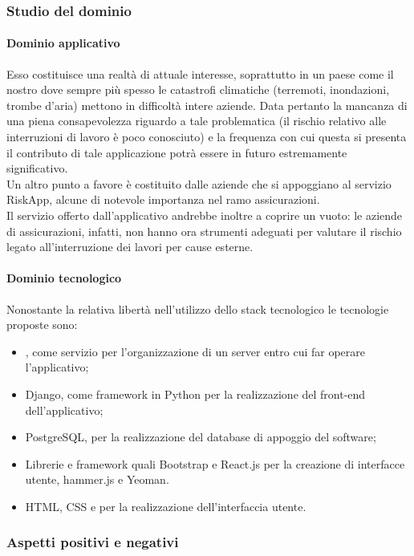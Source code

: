 		\subsubsection{Studio del dominio}
			\paragraph{Dominio applicativo}
			Esso costituisce una realtà di attuale interesse, soprattutto in un paese come il nostro dove sempre più spesso le catastrofi climatiche 
			(terremoti, inondazioni, trombe d'aria) mettono in difficoltà intere aziende. Data pertanto la mancanza di una piena consapevolezza 
			riguardo a tale problematica (il rischio relativo alle interruzioni di lavoro è poco conosciuto) e la frequenza con cui questa si presenta 
			il contributo di tale applicazione potrà essere in futuro estremamente significativo.
			\\Un altro punto a favore è costituito dalle aziende che si appoggiano al servizio RiskApp, alcune di notevole importanza nel ramo assicurazioni.
			\\Il servizio offerto dall'applicativo andrebbe inoltre a coprire un vuoto: le aziende di assicurazioni, infatti, non hanno ora strumenti 
			adeguati per valutare il rischio legato all'interruzione dei lavori per cause esterne.
			\paragraph{Dominio tecnologico}
			Nonostante la relativa libertà nell'utilizzo dello stack tecnologico le tecnologie proposte sono:
			\begin{itemize}
				\item {}, come servizio per l'organizzazione di un server entro cui far operare l'applicativo;
				\item Django, come framework in Python per la realizzazione del front-end dell'applicativo;
				\item PostgreSQL, per la realizzazione del database di appoggio del software;
				\item Librerie e framework quali Bootstrap e React.js per la creazione di interfacce utente, hammer.js e Yeoman.
				\item HTML, CSS e  per la realizzazione dell'interfaccia utente.
			\end{itemize}
		\subsubsection{Aspetti positivi e negativi}
